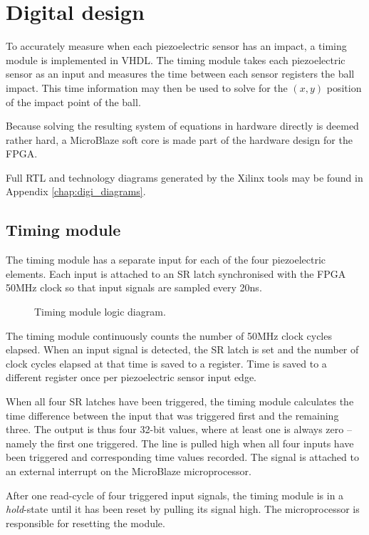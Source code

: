 \section{Digital design}
\label{cha:digidesign}
%
To accurately measure when each piezoelectric sensor has an impact, %
a timing module is implemented in VHDL.
The timing module takes each piezoelectric sensor as an input and measures the time between each sensor registers the ball impact.
This time information may then be used to solve for the $(x,y)$ position of the impact point of the ball.

Because solving the resulting system of equations in hardware directly is deemed rather hard, \cite{hardGauss}
 a MicroBlaze soft core is made part of the hardware design for the FPGA.

 Full RTL and technology diagrams generated by the Xilinx tools may be found in Appendix \ref{chap:digi_diagrams}.

\subsection{Timing module}
\label{sec:timing_module}
The timing module has a separate input for each of the four piezoelectric elements.
Each input is attached to an SR latch synchronised with the FPGA 50\si{MHz} clock so that input signals are sampled every 20\si{ns}.

\begin{figure}[htb]
    \centering
    
    \caption{Timing module logic diagram.}
    \label{fig:timing}
\end{figure}

The timing module continuously counts the number of 50\si{MHz} clock cycles elapsed.
When an input signal is detected, the SR latch is set and the number of clock cycles elapsed at that time is saved to a register.
Time is saved to a different register once per piezoelectric sensor input edge.

When all four SR latches have been triggered, the timing module calculates the time difference between the input that was triggered first and the remaining three.
The output is thus four 32-bit values, where at least one is always zero -- namely the first one triggered.
The line  is pulled high when all four inputs have been triggered and corresponding time values recorded.
The  signal is attached to an external interrupt on the MicroBlaze microprocessor.

After one read-cycle of four triggered input signals, the timing module is in a \emph{hold}-state until it has been reset by pulling its  signal high.
The microprocessor is responsible for resetting the module.